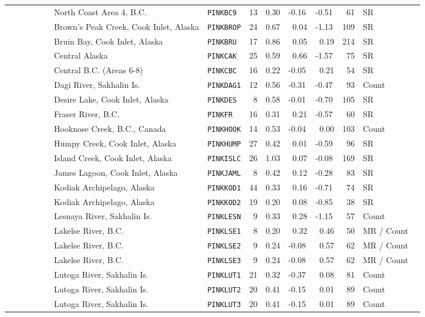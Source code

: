 \begin{flushleft}
\begin{tabular*}{7.1in}{llllllllll}
&~~~~~~~~~North Coast Area 4, B.C.&{\tt PINKBC9}&13&0.30&-0.16&-0.51&~61&SR  & \\ 
&~~~~~~~~~Brown's Peak Creek, Cook Inlet, Alaska&{\tt PINKBROP}&24&0.67&~0.04&-1.13&109&SR  & \\ 
&~~~~~~~~~Bruin Bay, Cook Inlet, Alaska&{\tt PINKBRU}&17&0.86&~0.05&~0.19&214&SR  & \\ 
&~~~~~~~~~Central Alaska&{\tt PINKCAK}&25&0.59&~0.66&-1.57&~75&SR  & \\ 
&~~~~~~~~~Central B.C. (Areas 6-8)&{\tt PINKCBC}&16&0.22&-0.05&~0.21&~54&SR  & \\ 
&~~~~~~~~~Dagi River, Sakhalin Is.&{\tt PINKDAG1}&12&0.56&-0.31&-0.47&~93&Count  & \\ 
&~~~~~~~~~Desire Lake, Cook Inlet, Alaska&{\tt PINKDES}&~8&0.58&-0.01&-0.70&105&SR  & \\ 
&~~~~~~~~~Fraser River, B.C.&{\tt PINKFR}&16&0.31&~0.21&-0.57&~60&SR  & \\ 
&~~~~~~~~~Hooknose Creek, B.C., Canada&{\tt PINKHOOK}&14&0.53&-0.04&~0.00&103&Count  & \\ 
&~~~~~~~~~Humpy Creek, Cook Inlet, Alaska&{\tt PINKHUMP}&27&0.42&~0.01&-0.59&~96&SR  & \\ 
&~~~~~~~~~Island Creek, Cook Inlet, Alaska&{\tt PINKISLC}&26&1.03&~0.07&-0.08&169&SR  & \\ 
&~~~~~~~~~James Lagoon, Cook Inlet, Alaska&{\tt PINKJAML}&~8&0.42&~0.12&-0.28&~83&SR  & \\ 
&~~~~~~~~~Kodiak Archipelago, Alaska&{\tt PINKKOD1}&44&0.33&~0.16&-0.71&~74&SR  & \\ 
&~~~~~~~~~Kodiak Archipelago, Alaska&{\tt PINKKOD2}&19&0.20&~0.08&-0.85&~38&SR  & \\ 
&~~~~~~~~~Lesnaya River, Sakhalin Is.&{\tt PINKLESN}&~9&0.33&~0.28&-1.15&~57&Count  & \\ 
&~~~~~~~~~Lakelse River, B.C.&{\tt PINKLSE1}&~8&0.20&~0.32&~0.46&~50&MR / Count  & \\ 
&~~~~~~~~~Lakelse River, B.C.&{\tt PINKLSE2}&~9&0.24&-0.08&~0.57&~62&MR / Count  & \\ 
&~~~~~~~~~Lakelse River, B.C.&{\tt PINKLSE3}&~9&0.24&-0.08&~0.57&~62&MR / Count  & \\ 
&~~~~~~~~~Lutoga River, Sakhalin Is.&{\tt PINKLUT1}&21&0.32&-0.37&~0.08&~81&Count  & \\ 
&~~~~~~~~~Lutoga River, Sakhalin Is.&{\tt PINKLUT2}&20&0.41&-0.15&~0.01&~89&Count  & \\ 
&~~~~~~~~~Lutoga River, Sakhalin Is.&{\tt PINKLUT3}&20&0.41&-0.15&~0.01&~89&Count  & \\ 
\end{tabular*} 
\end{flushleft}
